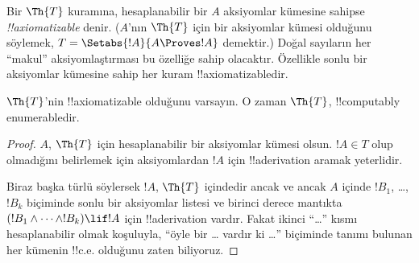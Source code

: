



Bir $\Th{T}$ kuramına, hesaplanabilir bir $A$ aksiyomlar kümesine sahipse
\emph{!!{axiomatizable}} denir. ($A$'nın $\Th{T}$ için bir aksiyomlar kümesi
olduğunu söylemek, $T = \Setabs{!A}{A \Proves !A}$ demektir.) Doğal
sayıların her “makul” aksiyomlaştırması bu özelliğe sahip olacaktır.
Özellikle sonlu bir aksiyomlar kümesine sahip her kuram
!!{axiomatizable}{}dir.

\begin{lem}
$\Th{T}$'nin !!{axiomatizable} olduğunu varsayın. O zaman $\Th{T}$,
!!{computably
enumerable}{}dir.
\end{lem}

\begin{proof}
$A$, $\Th{T}$ için hesaplanabilir bir aksiyomlar kümesi olsun. $!A \in T$
olup olmadığını belirlemek için aksiyomlardan $!A$ için !!a{derivation}
aramak yeterlidir.

Biraz başka türlü söylersek $!A$, $\Th{T}$ içindedir ancak ve ancak $A$
içinde $!B_1$, \dots, $!B_k$ biçiminde sonlu bir aksiyomlar listesi ve
birinci derece mantıkta
$(!B_1 \land \dots \land !B_k) \lif !A$ için !!a{derivation} vardır.
Fakat ikinci “\dots” kısmı hesaplanabilir olmak koşuluyla, “öyle bir \dots
vardır ki \dots” biçiminde tanımı bulunan her kümenin !!{c.e.} olduğunu
zaten biliyoruz.
\end{proof}

